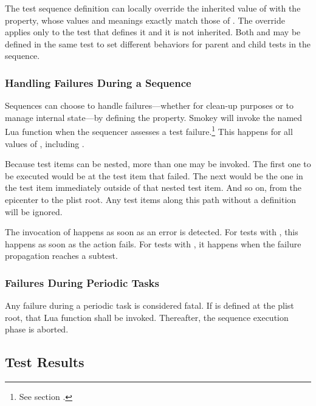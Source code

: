 The test sequence definition can locally override the inherited value of
 with the  property, whose values
and meanings exactly match those of .  The override
applies only to the test that defines it and it is not inherited.  Both
 and  may be defined in the same
test to set different behaviors for parent and child tests in the sequence.

\subsubsection{Handling Failures During a Sequence}
\label{sec:HandlingFailures}

Sequences can choose to handle failures---whether for clean-up purposes or to
manage internal state---by defining the  property.  Smokey
will invoke the named Lua function when the sequencer assesses a test
failure.\footnote{See section .} This happens
for all values of , including .

Because test items can be nested, more than one  may be
invoked.  The first one to be executed would be at the test item that failed.
The next would be the one in the test item immediately outside of that nested
test item.  And so on, from the epicenter to the plist root.  Any test items
along this path without a  definition will be ignored.

The invocation of  happens as soon as an error is detected.
For tests with , this happens as soon as the action
fails.  For tests with , it happens when the failure propagation
reaches a subtest.

\subsubsection{Failures During Periodic Tasks}

Any failure during a periodic task is considered fatal.  If 
is defined at the plist root, that Lua function shall be invoked.  Thereafter,
the sequence execution phase is aborted.

\subsection{Test Results}

